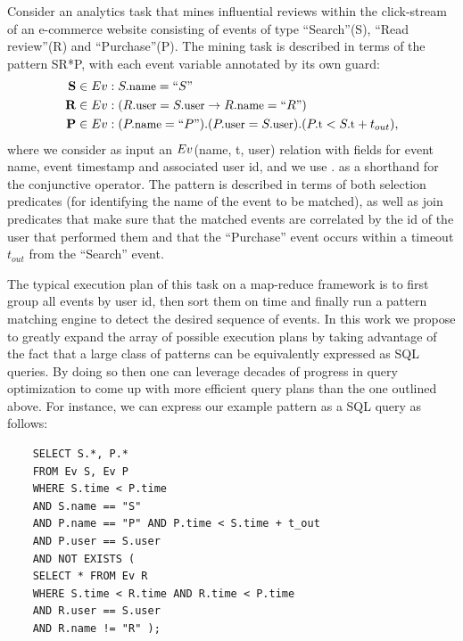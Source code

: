 Consider an analytics task that mines influential reviews
within the click-stream of an e-commerce website consisting of events of type
``Search''(S), ``Read review''(R) and ``Purchase''(P).
The mining task is described in terms of the pattern SR*P, with each event 
variable annotated by its own guard:
\begin{align*}
\text{{\bf S}} \in \Ev&: \facc{S}{name} = ``S"
\\
\text{{\bf R}} \in \Ev&: (\facc{R}{user} = \facc{S}{user} \rightarrow
\facc{R}{name} = ``R")
\\
\text{{\bf P}} \in \Ev&: (\facc{P}{name} = ``P") . 
(\facc{P}{user} = \facc{S}{user}) . 
(\facc{P}{t} < \facc{S}{t} + t_{out}),
\end{align*}
where we consider as input an $Ev$(name, t, user) relation with fields for 
event name, event timestamp and associated user id, and we use $.$ as a 
shorthand for the conjunctive operator. 
The pattern is described in terms of both selection predicates (for identifying 
the name of the event to be matched), as well as join predicates that make sure 
that the matched events are correlated by the id of the user that performed 
them and that the ``Purchase'' event occurs within a timeout $t_{out}$ from the 
``Search'' event. 

The typical execution plan of this task on a map-reduce framework is to first
group all events by user id, then sort them on time and finally run a pattern
matching engine to detect the desired sequence of events.
In this work we propose to greatly expand the array of possible execution plans
by taking advantage of the fact that a large class of patterns can be
equivalently expressed as SQL queries.
By doing so then one can leverage decades of progress in query optimization to
come up with more efficient query plans than the one outlined above.
For instance, we can express our example pattern as a SQL query as follows:
{\small
	\begin{verbatim}
	SELECT S.*, P.*
	FROM Ev S, Ev P
	WHERE S.time < P.time
	AND S.name == "S"   
	AND P.name == "P" AND P.time < S.time + t_out
	AND P.user == S.user
	AND NOT EXISTS ( 
	SELECT * FROM Ev R
	WHERE S.time < R.time AND R.time < P.time
	AND R.user == S.user
	AND R.name != "R" ); 
	\end{verbatim}
}

